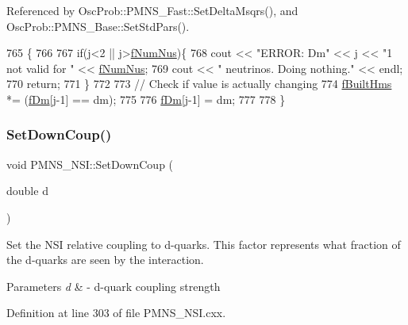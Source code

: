 Referenced by Osc\+Prob\+::\+P\+M\+N\+S\+\_\+\+Fast\+::\+Set\+Delta\+Msqrs(), and Osc\+Prob\+::\+P\+M\+N\+S\+\_\+\+Base\+::\+Set\+Std\+Pars().


\begin{DoxyCode}
765 \{
766 
767   \textcolor{keywordflow}{if}(j<2 || j>\hyperlink{classOscProb_1_1PMNS__Base_a24bb74bed63569dfe88b18fa6a08060e}{fNumNus})\{
768     cout << \textcolor{stringliteral}{"ERROR: Dm"} << j << \textcolor{stringliteral}{"1 not valid for "} << \hyperlink{classOscProb_1_1PMNS__Base_a24bb74bed63569dfe88b18fa6a08060e}{fNumNus};
769     cout << \textcolor{stringliteral}{" neutrinos. Doing nothing."} << endl;
770     \textcolor{keywordflow}{return};
771   \}
772 
773   \textcolor{comment}{// Check if value is actually changing}
774   \hyperlink{classOscProb_1_1PMNS__Base_a9ac3cadeac8db1b90f3152f476244780}{fBuiltHms} *= (\hyperlink{classOscProb_1_1PMNS__Base_a406a31c3b5d620e5a0cace5b411f9f70}{fDm}[j-1] == dm);
775 
776   \hyperlink{classOscProb_1_1PMNS__Base_a406a31c3b5d620e5a0cace5b411f9f70}{fDm}[j-1] = dm;
777 
778 \}
\end{DoxyCode}
\mbox{\label{classOscProb_1_1PMNS__NSI_abcc85b0662bd6d08fc5a0bc713657129}} 
\subsubsection{\texorpdfstring{Set\+Down\+Coup()}{SetDownCoup()}}
{\footnotesize\ttfamily void P\+M\+N\+S\+\_\+\+N\+S\+I\+::\+Set\+Down\+Coup (\begin{DoxyParamCaption}\item[{double}]{d }\end{DoxyParamCaption})\hspace{0.3cm}{\ttfamily [virtual]}}

Set the N\+SI relative coupling to d-\/quarks. This factor represents what fraction of the d-\/quarks are seen by the interaction.


\begin{DoxyParams}{Parameters}
{\em d} & -\/ d-\/quark coupling strength \\
\hline
\end{DoxyParams}


Definition at line 303 of file P\+M\+N\+S\+\_\+\+N\+S\+I.\+cxx.



